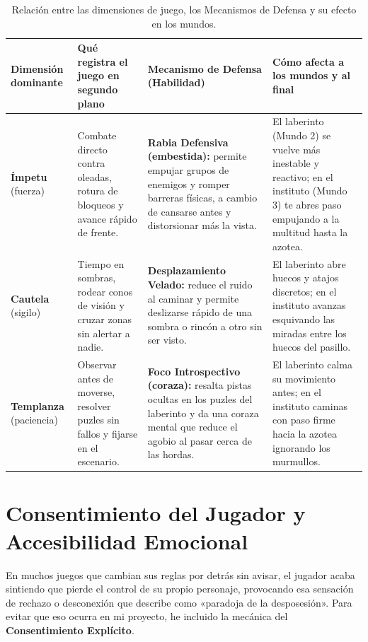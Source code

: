 \begin{table}[H]
  \centering
  \caption{Relación entre las dimensiones de juego, los Mecanismos de Defensa y su efecto en los mundos.}
  \label{tab:mutacion-mecanicas}
  \small
  \renewcommand{\arraystretch}{1.25}
  \begin{tabularx}{\textwidth}{>{\raggedright\arraybackslash}p{2.3cm}YYY}
    \toprule
    Dimensión dominante & Qué registra el juego en segundo plano & Mecanismo de Defensa (Habilidad) & Cómo afecta a los mundos y al final \\
    \midrule
    \textbf{Ímpetu} (fuerza) & Combate directo contra oleadas, rotura de bloqueos y avance rápido de frente. & \textbf{Rabia Defensiva (embestida):} permite empujar grupos de enemigos y romper barreras físicas, a cambio de cansarse antes y distorsionar más la vista. & El laberinto (Mundo 2) se vuelve más inestable y reactivo; en el instituto (Mundo 3) te abres paso empujando a la multitud hasta la azotea. \\
    \textbf{Cautela} (sigilo) & Tiempo en sombras, rodear conos de visión y cruzar zonas sin alertar a nadie. & \textbf{Desplazamiento Velado:} reduce el ruido al caminar y permite deslizarse rápido de una sombra o rincón a otro sin ser visto. & El laberinto abre huecos y atajos discretos; en el instituto avanzas esquivando las miradas entre los huecos del pasillo. \\
    \textbf{Templanza} (paciencia) & Observar antes de moverse, resolver puzles sin fallos y fijarse en el escenario. & \textbf{Foco Introspectivo (coraza):} resalta pistas ocultas en los puzles del laberinto y da una coraza mental que reduce el agobio al pasar cerca de las hordas. & El laberinto calma su movimiento antes; en el instituto caminas con paso firme hacia la azotea ignorando los murmullos. \\
    \bottomrule
  \end{tabularx}
\end{table}

\section{Consentimiento del Jugador y Accesibilidad Emocional}
En muchos juegos que cambian sus reglas por detrás sin avisar, el jugador acaba sintiendo que pierde el control de su propio personaje, provocando esa sensación de rechazo o desconexión que \textcite{gomez2026} describe como «paradoja de la desposesión». Para evitar que eso ocurra en mi proyecto, he incluido la mecánica del \textbf{Consentimiento Explícito}.

